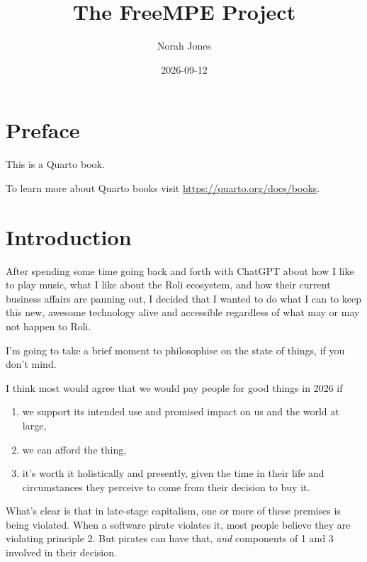 \documentclass[
  letterpaper,
  DIV=11,
  numbers=noendperiod]{scrreprt}
\title{The FreeMPE Project}
\author{Norah Jones}
\date{2026-09-12}
\providecommand{\tightlist}{%
  \setlength{\itemsep}{0pt}\setlength{\parskip}{0pt}}
\renewcommand*\contentsname{Table of contents}
\newcommand\contentsname{Table of contents}
\begin{document}
\maketitle

\renewcommand*\contentsname{Table of contents}
{
\setcounter{tocdepth}{2}
\tableofcontents
}


\chapter*{Preface}\label{preface}


This is a Quarto book.

To learn more about Quarto books visit
\url{https://quarto.org/docs/books}.


\chapter{Introduction}\label{introduction}

After spending some time going back and forth with ChatGPT about how I
like to play music, what I like about the Roli ecosystem, and how their
current business affairs are panning out, I decided that I wanted to do
what I can to keep this new, awesome technology alive and accessible
regardless of what may or may not happen to Roli.

I'm going to take a brief moment to philosophise on the state of things,
if you don't mind.

I think most would agree that we would pay people for good things in
2026 if

\begin{enumerate}
\def\labelenumi{\arabic{enumi})}
\tightlist
\item
  we support its intended use and promised impact on us and the world at
  large,
\item
  we can afford the thing,
\item
  it's worth it holistically and presently, given the time in their life
  and circumstances they perceive to come from their decision to buy it.
\end{enumerate}

What's clear is that in late-stage capitalism, one or more of these
premises is being violated. When a software pirate violates it, most
people believe they are violating principle 2. But pirates can have
that, \emph{and} components of 1 and 3 involved in their decision.
\end{document}
